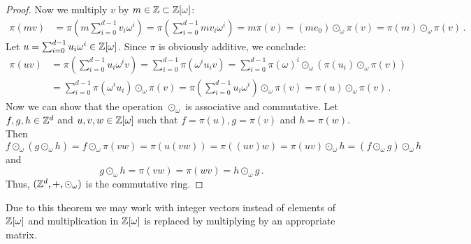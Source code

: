 \begin{proof}
Now we multiply $v$ by $m\in\mathbb{Z}\subset\mathbb{Z}[\omega]$:
\begin{align*}
\pi(m v)&=\pi\left(m \sum_{i=0}^{d-1} v_i \omega^i\right)=\pi \left(\sum_{i=0}^{d-1} m v_i \omega^i\right)=m \pi(v)= (m e_0) \odot_\omega\pi(v)= \pi(m)\odot_\omega\pi(v)\,.
\end{align*}
Let $u=\sum_{i=0}^{d-1} u_i \omega^i\in\mathbb{Z}[\omega]$. Since $\pi$ is obviously additive, we conclude:
\begin{align*}
\pi(uv)&=\pi\left(\sum_{i=0}^{d-1} u_i \omega^i v\right)=\sum_{i=0}^{d-1}\pi(\omega^i u_i  v)=\sum_{i=0}^{d-1}\pi(\omega)^i \odot_\omega\left(\pi(u_i)\odot_\omega\pi(v)\right) \\
    &=\sum_{i=0}^{d-1}\pi(\omega^i u_i)\odot_\omega \pi(v)=\pi\left(\sum_{i=0}^{d-1}u_i\omega^i\right)\odot_\omega\pi(v)=\pi(u)\odot_\omega \pi(v)\,.
\end{align*}
Now we can show that the operation $\odot_\omega$ is associative and commutative. Let $f,g,h\in \mathbb{Z}^d$ and $u,v,w\in\mathbb{Z}[\omega]$ such that $f=\pi(u),g=\pi(v)$ and $h=\pi(w)$. Then
$$
f\odot_\omega(g\odot_\omega h)=f\odot_\omega\pi(vw)=\pi(u(vw))=\pi((uv)w)=\pi(uv)\odot_\omega h=(f\odot_\omega g)\odot_\omega h
$$
and
$$
g\odot_\omega h=\pi(vw)=\pi(wv)=h\odot_\omega g\,.
$$
Thus, $(\mathbb{Z}^d,+,\odot_\omega)$ is the commutative ring.
\end{proof}

Due to this theorem we may work with integer vectors instead of elements of $\mathbb{Z}[\omega]$ and multiplication in $\mathbb{Z}[\omega]$ is replaced by multiplying by an appropriate matrix. 

